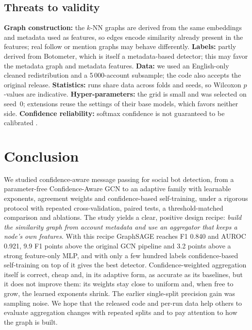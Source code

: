 \documentclass[conference]{IEEEtran}
\begin{document}
\subsection{Threats to validity}
\label{sec:threats}
\textbf{Graph construction:} the $k$-NN graphs are derived from the same embeddings and metadata used as features, so edges encode similarity already present in the features; real follow or mention graphs may behave differently. \textbf{Labels:} partly derived from Botometer, which is itself a metadata-based detector; this may favor the metadata graph and metadata features. \textbf{Data:} we used an English-only cleaned redistribution and a 5\,000-account subsample; the code also accepts the original release. \textbf{Statistics:} runs share data across folds and seeds, so Wilcoxon $p$-values are indicative. \textbf{Hyper-parameters:} the grid is small and was selected on seed~0; extensions reuse the settings of their base models, which favors neither side. \textbf{Confidence reliability:} softmax confidence is not guaranteed to be calibrated \cite{guo2017calibration}.

\section{Conclusion}
We studied confidence-aware message passing for social bot detection, from a parameter-free Confidence-Aware GCN to an adaptive family with learnable exponents, agreement weights and confidence-based self-training, under a rigorous protocol with repeated cross-validation, paired tests, a threshold-matched comparison and ablations. The study yields a clear, positive design recipe: \emph{build the similarity graph from account metadata and use an aggregator that keeps a node's own features}. With this recipe GraphSAGE reaches F1 0.840 and AUROC 0.921, 9.9 F1 points above the original GCN pipeline and 3.2 points above a strong feature-only MLP, and with only a few hundred labels confidence-based self-training on top of it gives the best detector. Confidence-weighted aggregation itself is correct, cheap and, in its adaptive form, as accurate as its baselines, but it does not improve them: its weights stay close to uniform and, when free to grow, the learned exponents shrink. The earlier single-split precision gain was sampling noise. We hope that the released code and per-run data help others to evaluate aggregation changes with repeated splits and to pay attention to how the graph is built.
\end{document}
